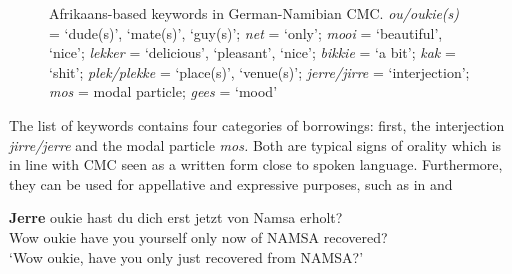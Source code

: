 \documentclass[output=paper]{langsci/langscibook}
\begin{document}
  \begin{figure}
\caption{Afrikaans-based keywords in German-Namibian CMC. \textit{ou/oukie(s)} = ‘dude(s)’, ‘mate(s)’, ‘guy(s)’; \textit{net} = ‘only’; \textit{mooi} = ‘beautiful’, ‘nice’; \textit{lekker} = ‘delicious’, ‘pleasant’, ‘nice’; \textit{bikkie} = ‘a bit’; \textit{kak} = ‘shit’; \textit{plek/plekke} = ‘place(s)’, ‘venue(s)’; \textit{jerre/jirre} = ‘interjection’; \textit{mos} = modal particle; \textit{gees} = ‘mood’}
\label{fig:radke:3}
\end{figure}  

The list of keywords contains four categories of borrowings: first, the interjection \textit{jirre/jerre} and the modal particle \textit{mos.} Both are typical signs of orality which is in line with CMC seen as a written form close to  spoken language. Furthermore, they can be used for appellative and expressive purposes, such as in  and 

\ea
\label{ex:radke:5}
\gll \textbf{Jerre} oukie hast du dich erst jetzt von Namsa erholt? \\
	Wow oukie have you yourself only now of NAMSA recovered?\\
	\glt `Wow oukie, have you only just recovered from NAMSA?'\\
\z
\end{document}
